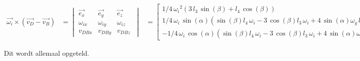 \begin{equation*}
\begin{split}
\overrightarrow{\omega_{i}}\times(\overrightarrow{v_{D}}-\overrightarrow{v_{B}})
&=	\begin{vmatrix}
	\overrightarrow{e_{x}} & \overrightarrow{e_{y}} & \overrightarrow{e_{z}}\\
	\omega_{ix} & \omega_{iy} & \omega_{iz}\\
	v_{DBx} & v_{DBy} & v_{DBz}\
	\end{vmatrix}
&=	\begin{bmatrix}
	1/4\,{\omega_{i}}^{2} \left( 3\,l_{3}\,\sin\left( \beta \right) +l_{4}\,\cos \left( \beta \right)  \right) \\
	1/4\,\omega_{i}\,\sin \left( \alpha \right) \left( \sin \left( \beta \right) l_{4}\,\omega_{i}-3\,\cos \left( \beta \right) l_{3}\,\omega_{i}+4\,\sin \left( \alpha \right) \omega_{g}\,l_{2} \right) \\
	-1/4\,\omega_{i}\,\cos \left( \alpha \right)  \left( \sin \left( \beta \right) l_{4}\,\omega_{i}-3\,\cos \left( \beta \right) l_{3}\,\omega_{i}+4\,\sin \left( \alpha\right) \omega_{g}\,l_{2} \right) \
	\end{bmatrix}
\end{split}
\end{equation*}

Dit wordt allemaal opgeteld.

